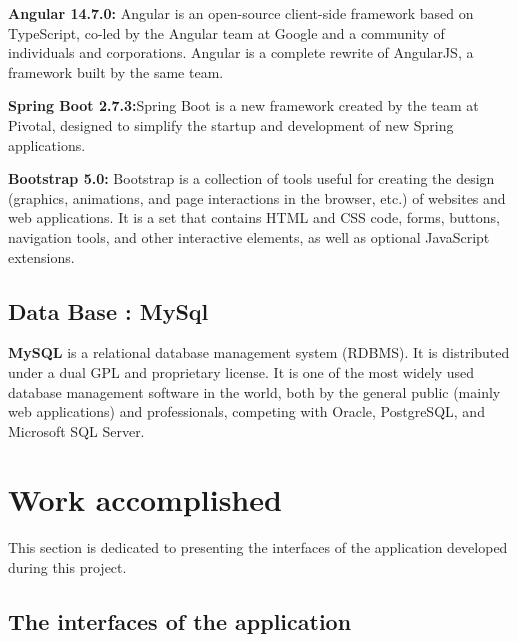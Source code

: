         \item \textbf{Angular 14.7.0:} Angular is an open-source client-side framework based on TypeScript, co-led by the Angular team at Google and a community of individuals and corporations. Angular is a complete rewrite of AngularJS, a framework built by the same team. 
        \item \textbf{Spring  Boot 2.7.3:}Spring Boot is a new framework created by the team at Pivotal, designed to simplify the startup and development of new Spring applications. 
\item \textbf{Bootstrap 5.0:} Bootstrap is a collection of tools useful for creating the design (graphics, animations, and page interactions in the browser, etc.) of websites and web applications. It is a set that contains HTML and CSS code, forms, buttons, navigation tools, and other interactive elements, as well as optional JavaScript extensions. 

\subsection{Data Base : MySql  }

\textbf{MySQL} is a relational database management system (RDBMS). It is distributed under a dual GPL and proprietary license. It is one of the most widely used database management software in the world, both by the general public (mainly web applications) and professionals, competing with Oracle, PostgreSQL, and Microsoft SQL Server. 

\section{Work accomplished  }

This section is dedicated to presenting the interfaces of the application developed during this project. 

\subsection{The interfaces of the application  }

